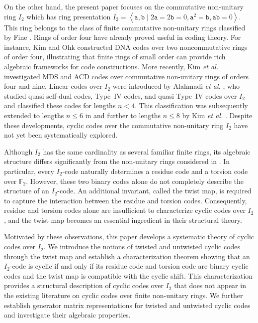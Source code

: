 \documentclass[12pt]{article}
\theoremstyle{definition}
\theoremstyle{plain}
\begin{document}
On the other hand, the present paper focuses on the commutative non-unitary ring $I_2$ which has ring presentation $I_2 =  \left\langle \mathtt{a} , \mathtt{b}   \mid 2 \mathtt{a}  = 2 \mathtt{b} = 0, \mathtt{a}^{2} = \mathtt{b},  \mathtt{a b}=0   \right\rangle$. This ring belongs to the class of finite commutative non-unitary rings classified by Fine \cite{Fine}. Rings of order four have already proved useful in coding theory. For instance, Kim and Ohk \cite{KimJLOhkDE_DNAcodes} constructed DNA codes over two noncommutative rings of order four, illustrating that finite rings of small order can provide rich algebraic frameworks for code constructions. More recently, Kim \textit{et al.} \cite{KimJLOlavMYGRoe_MDSACDI2I3} investigated MDS and ACD codes over commutative non-unitary rings of orders four and nine. Linear codes over $I_2$ were introduced by Alahmadi \textit{et al.} \cite{QuasiTypeIV_I2}, who studied quasi self-dual codes, Type~IV codes, and quasi Type~IV codes over $I_2$ and classified these codes for lengths $n<4$. This classification was subsequently extended to lengths $n\le6$ in \cite{BuildUp_I2} and further to lengths $n\le8$ by Kim \textit{et al.} \cite{KimJLYGRoe_I2}. Despite these developments, cyclic codes over the commutative non-unitary ring $I_2$ have not yet been systematically explored.

Although $I_2$ has the same cardinality as several familiar finite rings, its algebraic structure differs significantly from the non-unitary rings considered in \cite{CyclicH2,CyclicE2}. In particular, every $I_2$-code naturally determines a residue code and a torsion code over $\mathbb F_2$. However, these two binary codes alone do not completely describe the structure of an $I_2$-code. An additional invariant, called the twist map, is required to capture the interaction between the residue and torsion codes. Consequently, residue and torsion codes alone are insufficient to characterize cyclic codes over $I_2$, and the twist map becomes an essential ingredient in their structural theory.

Motivated by these observations, this paper develops a systematic theory of cyclic codes over $I_2$. We introduce the notions of twisted and untwisted cyclic codes through the twist map and establish a characterization theorem showing that an $I_2$-code is cyclic if and only if its residue code and torsion code are binary cyclic codes and the twist map is compatible with the cyclic shift. This characterization provides a structural description of cyclic codes over $I_2$ that does not appear in the existing literature on cyclic codes over finite non-unitary rings. We further establish generator matrix representations for twisted and untwisted cyclic codes and investigate their algebraic properties.
\end{document}
